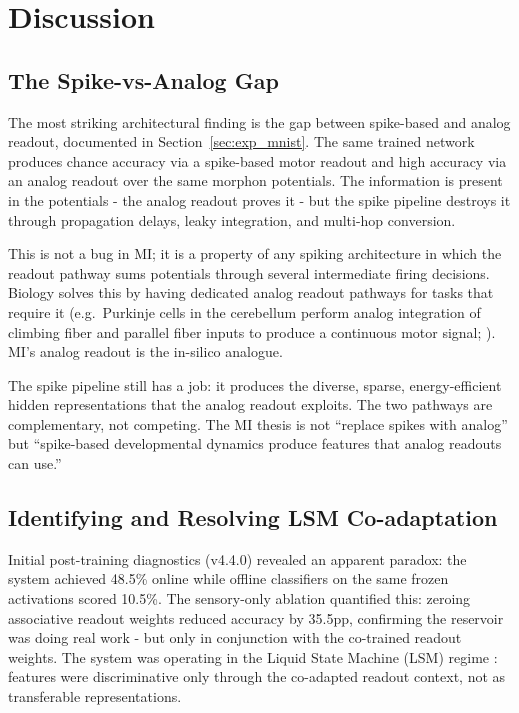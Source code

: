 \section{Discussion}
\label{sec:discussion}

\subsection{The Spike-vs-Analog Gap}

The most striking architectural finding is the gap between spike-based and analog readout, documented in Section~\ref{sec:exp_mnist}. The same trained network produces chance accuracy via a spike-based motor readout and high accuracy via an analog readout over the same morphon potentials. The information is present in the potentials - the analog readout proves it - but the spike pipeline destroys it through propagation delays, leaky integration, and multi-hop conversion.

This is not a bug in MI; it is a property of any spiking architecture in which the readout pathway sums potentials through several intermediate firing decisions. Biology solves this by having dedicated analog readout pathways for tasks that require it (e.g.\ Purkinje cells in the cerebellum perform analog integration of climbing fiber and parallel fiber inputs to produce a continuous motor signal; \cite{ito2006cerebellar}). MI's analog readout is the in-silico analogue.

The spike pipeline still has a job: it produces the diverse, sparse, energy-efficient hidden representations that the analog readout exploits. The two pathways are complementary, not competing. The MI thesis is not ``replace spikes with analog'' but ``spike-based developmental dynamics produce features that analog readouts can use.''

\subsection{Identifying and Resolving LSM Co-adaptation}

Initial post-training diagnostics (v4.4.0) revealed an apparent paradox: the system achieved 48.5\% online while offline classifiers on the same frozen activations scored 10.5\%. The sensory-only ablation quantified this: zeroing associative readout weights reduced accuracy by 35.5pp, confirming the reservoir was doing real work - but only in conjunction with the co-trained readout weights. The system was operating in the Liquid State Machine (LSM) regime \cite{maass2002real,lukosevicius2009reservoir}: features were discriminative only through the co-adapted readout context, not as transferable representations.

